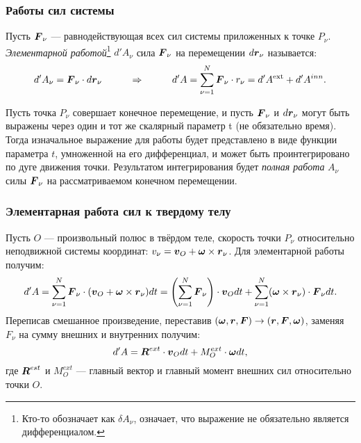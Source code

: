 \subsubsection*{Работы сил системы}
\begin{to_def}
	Пусть $\mbox{\boldmath $F$}_\nu $ --- равнодействующая всех сил системы приложенных к точке $P_\nu$.
	\textit{Элементарной работой}\footnote{Кто-то обозначает как $\delta A_\nu$, означает, что выражение не обязательно является дифференциалом.} $d'A_\nu$ сила $\mbox{\boldmath $F$}_\nu$ на перемещении $d \mbox{\boldmath $r$}_\nu$ называется:
	\begin{equation*}
		d' A_\nu = \mbox{\boldmath $F$}_\nu \cdot d \mbox{\boldmath $r$}_\nu
		\hspace*{1 cm}
		\Rightarrow
		\hspace*{1 cm}
		d' A = \sum_{\nu=1}^N \mbox{\boldmath $F$}_\nu \cdot r_\nu = d' A^{\text{ext}} + d' A^{inn}.
	\end{equation*}
\end{to_def}
Пусть точка $P_\nu$ совершает конечное перемещение, и пусть $\mbox{\boldmath $F$}_\nu$ и $d \mbox{\boldmath $r$}_\nu$ могут быть выражены через один и тот же скалярный параметр t (не обязательно время). Тогда изначальное выражение для работы будет представлено в виде функции параметра $t$, умноженной на его дифференциал, и может быть проинтегрировано по дуге движения точки. Результатом интегрирования будет \textit{полная работа} $A_{\nu}$ силы $\mbox{\boldmath $F$}_{\nu}$ на рассматриваемом конечном перемещении.

\subsubsection*{Элементарная работа сил к твердому телу}
Пусть $O$ --- произвольный полюс в твёрдом теле, скорость точки $P_\nu$ относительно неподвижной системы координат: $v_\nu = \mbox{\boldmath $v$}_O + \mbox{\boldmath $\omega$}\times \mbox{\boldmath $r$}_\nu$.
Для элементарной работы получим:
\begin{equation*}
	d' A = \sum_{\nu=1}^N \mbox{\boldmath $F$}_\nu \cdot (\mbox{\boldmath $v$}_O + \mbox{\boldmath $\omega$}\times \mbox{\boldmath $r$}_\nu) d t = \left(\sum_{\nu=1}^N \mbox{\boldmath $F$}_{\nu}\right) \cdot \mbox{\boldmath $v$}_O d t + \sum_{\nu=1}^N (\mbox{\boldmath $\omega$} \times \mbox{\boldmath $r$}_{\nu}) \cdot \mbox{\boldmath $F$}_\nu dt.
\end{equation*}
Переписав смешанное произведение, переставив $(\mbox{\boldmath $\omega$}, \mbox{\boldmath $r$}, \mbox{\boldmath $F$}) \rightarrow (\mbox{\boldmath $r$}, \mbox{\boldmath $F$}, \mbox{\boldmath $\omega$})$, заменяя $F_\nu$ на сумму внешних и внутренних получим:
\begin{equation*}
	d' A = \mbox{\boldmath $R$}^{ext} \cdot \mbox{\boldmath $v$}_O d t + M_O^{ext} \cdot \mbox{\boldmath $\omega$} d t,
\end{equation*}
где $\mbox{\boldmath $R$}^{est}$ и $M_O^{ext}$ --- главный вектор и главный момент внешних сил относительно точки $O$.


